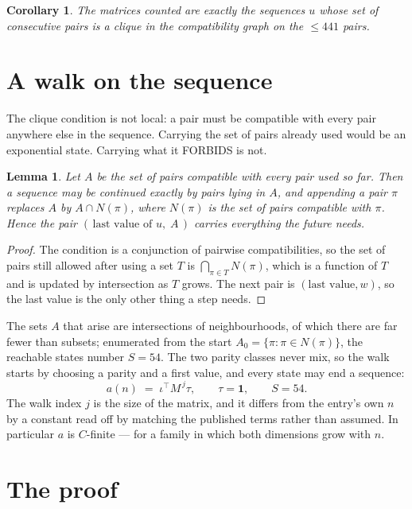 \documentclass[11pt,a4paper]{article}
\theoremstyle{plain}
\newtheorem{lemma}[theorem]{Lemma}
\newtheorem{corollary}[theorem]{Corollary}
\theoremstyle{definition}
\begin{document}
\begin{corollary}
The matrices counted are exactly the sequences $u$ whose set of consecutive pairs is a clique in
the compatibility graph on the $\le 441$ pairs.
\end{corollary}

\section{A walk on the sequence}

The clique condition is not local: a pair must be compatible with every pair anywhere else in
the sequence. Carrying the set of pairs already used would be an exponential state. Carrying
what it FORBIDS is not.

\begin{lemma}\label{lem:lump}
Let $A$ be the set of pairs compatible with every pair used so far. Then a sequence may be
continued exactly by pairs lying in $A$, and appending a pair $\pi$ replaces $A$ by
$A\cap N(\pi)$, where $N(\pi)$ is the set of pairs compatible with $\pi$. Hence the pair
$(\,\text{last value of }u,\;A\,)$ carries everything the future needs.
\end{lemma}

\begin{proof}
The condition is a conjunction of pairwise compatibilities, so the set of pairs still allowed
after using a set $T$ is $\bigcap_{\pi\in T}N(\pi)$, which is a function of $T$ and is updated
by intersection as $T$ grows. The next pair is $(\text{last value},w)$, so the last value is
the only other thing a step needs.
\end{proof}

The sets $A$ that arise are intersections of neighbourhoods, of which there are far fewer than
subsets; enumerated from the start $A_0=\{\pi:\pi\in N(\pi)\}$, the reachable states number
$S=54$. The two parity classes never mix, so the walk starts by choosing a parity and a first
value, and every state may end a sequence:
\[
a(n)\;=\;\iota^{\!\top}M^{\,j}\tau ,\qquad \tau=\mathbf{1},\qquad S=54.
\]
The walk index $j$ is the size of the matrix, and it differs from the entry's own $n$ by a
constant read off by matching the published terms rather than assumed. In particular $a$ is
$C$-finite --- for a family in which both dimensions grow with $n$.

\section{The proof}
\end{document}
